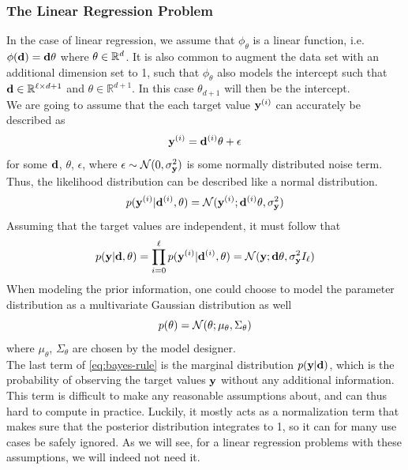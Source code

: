 \subsubsection{The Linear Regression Problem}
In the case of linear regression, we assume that $\phi_\theta$ is a linear function, i.e. $\phi(\mathbf{d}) = \mathbf{d}\mathbf{\theta}$ where $\mathbf{\theta}\in \mathbb{R}^{d}$. 
It is also common to augment the data set with an additional dimension set to 1, such that $\phi_\theta$ also models the intercept such that $\mathbf{d} \in \mathbb{R}^{\ell \times d + 1}$ and $\theta \in \mathbb{R}^{d + 1}$. In this case $\theta_{d+1}$ will then be the intercept.\\

We are going to assume that the each target value $\mathbf{y}^{(i)}$ can accurately be described as
\begin{equation}
  \label{eq:likelihood-generating}
  \mathbf{y}^{(i)} = \mathbf{d}^{(i)}\theta + \epsilon
\end{equation}
for some $\mathbf{d}$, $\theta$, $\epsilon$, where $\epsilon \sim \mathcal{N}(0, \sigma^2_{\mathbf{y}})$ is some normally distributed noise term.
Thus, the likelihood distribution can be described like a normal distribution.
\begin{equation}
  \label{eq:likelihood-single}
  p(\textbf{y}^{(i)} | \mathbf{d}^{(i)}, \mathbf{\theta}) = \mathcal{N}(\mathbf{y}^{(i)}; \mathbf{d}^{(i)}\mathbf{\theta}, \sigma^2_{\mathbf{y}})
\end{equation}
Assuming that the target values are independent, it must follow that
\begin{equation}
  \label{eq:likelihood}
  p(\textbf{y} | \mathbf{d}, \mathbf{\theta}) = \prod_{i=0}^\ell p(\textbf{y}^{(i)} | \mathbf{d}^{(i)}, \mathbf{\theta}) = \mathcal{N}(\mathbf{y}; \mathbf{d}\mathbf{\theta}, \sigma^2_{\mathbf{y}}I_\ell)
\end{equation}
When modeling the prior information, one could choose to model the parameter distribution as a multivariate Gaussian distribution as well
\begin{equation}
  \label{eq:prior}
  p(\mathbf{\theta}) = \mathcal{N}(\theta; \mu_{\theta}, \Sigma_\theta)
\end{equation}
where $\mu_\theta$, $\Sigma_\theta$ are chosen by the model designer. \\
The last term of \eqref{eq:bayes-rule} is the marginal distribution $p(\mathbf{y}| \mathbf{d})$, which is the probability of observing the target values $\mathbf{y}$ without any additional information. 
This term is difficult to make any reasonable assumptions about, and can thus hard to compute in practice.
Luckily, it mostly acts as a normalization term that makes sure that the posterior distribution integrates to 1, so it can for many use cases be safely ignored.
As we will see, for a linear regression problems with these assumptions, we will indeed not need it.
